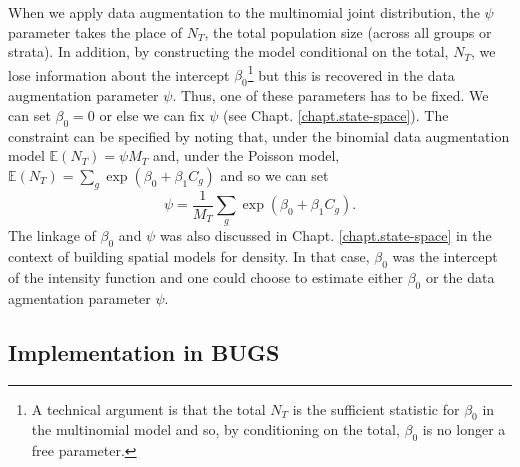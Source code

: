 When we apply data augmentation to the multinomial joint distribution,
the $\psi$ parameter takes the place of $N_{T}$, the total population
size (across all groups or strata). In addition, by
constructing the
model conditional on the total, $N_{T}$, we lose information about the
intercept $\beta_{0}$\footnote{
A technical argument is that the total $N_{T}$ is the sufficient
statistic for $\beta_{0}$ in the multinomial model and so, by conditioning on the total,
$\beta_{0}$ is no longer a free parameter.}
but this is recovered in the data augmentation
parameter $\psi$.
Thus, one of these parameters has to be fixed. We can set $\beta_0 = 0$ or
else we can fix $\psi$ (see Chapt. \ref{chapt.state-space}).  The
constraint can be specified by noting that, under the binomial data
augmentation model $\mathbb{E}(N_{T}) = \psi M_{T}$ and, under the
Poisson model, $\mathbb{E}(N_{T}) = \sum_{g} \exp(\beta_{0} +
\beta_{1} C_{g})$ and so we can set
\[
 \psi = \frac{1}{M_{T}} \sum_{g} \exp(\beta_{0} + \beta_{1} C_{g}).
\]
The linkage of $\beta_{0}$ and $\psi$ was also discussed in
Chapt. \ref{chapt.state-space} in the context of building spatial
models for density. In that case, $\beta_0$ was the intercept of the
intensity function and one could choose to estimate either $\beta_0$
or the data agmentation parameter $\psi$.

\subsection{Implementation in BUGS}

